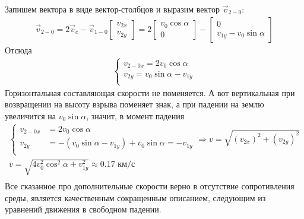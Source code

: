\documentclass[a5paper,10pt]{article}\usepackage[usenames,dvipsnames]{color}
\begin{document}
Запишем вектора в виде вектор-столбцов и выразим вектор $\vec{v}_{2-0}$:
\vspace{-0.5em}
\begin{gather*}
    \vec{v}_{2-0}=2\vec{v}_c-\vec{v}_{1-0}
    \begin{bmatrix}
        v_{2x}\\
        v_{2y}
    \end{bmatrix}=
    2\begin{bmatrix}
        v_0\cos\alpha\\
        0
    \end{bmatrix}-
    \begin{bmatrix}
        0\\
        v_{1y}-v_0\sin\alpha
    \end{bmatrix}
\end{gather*}
Отсюда
\vspace{-0.5em}
\begin{gather*}
    \left\{\begin{aligned}
        v_{2-0x}=2v_0\cos\alpha\\
        v_{2y}=v_0\sin\alpha-v_{1y}\\
    \end{aligned}\right.
\end{gather*}
Горизонтальная составляющая скорости не поменяется. А вот вертикальная при возвращении на высоту взрыва поменяет знак, а при падении на землю увеличится на $v_0\sin\alpha$, значит, в момент падения
\vspace{-0.5em}
\begin{gather*}
    \left\{\begin{aligned}
        v_{2-0x}&=2v_0\cos\alpha\\
        v_{2y}&=-(v_0\sin\alpha-v_{1y})+v_0\sin\alpha=-v_{1y}\\
    \end{aligned}\right.
    \Rightarrow
    v=\sqrt{(v_{2x})^2+(v_{2y})^2}\\
    v=\sqrt{4v_0^2\cos^2\alpha+v_{1y}^2}\approx0.17 \text{ км/с}\\    
\end{gather*}
Все сказанное про дополнительные скорости верно в отсутствие сопротивления среды, является качественным сокращенным описанием, следующим из уравнений движения в свободном падении.
\end{document}
